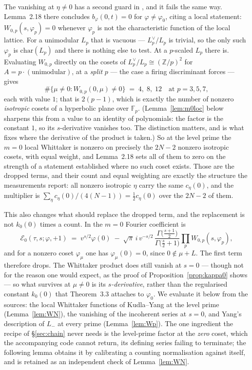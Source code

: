 \documentclass[11pt,reqno]{amsart}
\theoremstyle{plain}
\theoremstyle{definition}
\newcommand{\Z}{\mathbb{Z}}
\newcommand{\Lm}{L_{-}}
\begin{document}
The vanishing at $\eta\neq0$ has a second guard in \cite{SchoferThesis}, and it fails the same way.
Lemma~2.18 there concludes $b_\varphi(0,t)=0$ for $\varphi\neq\varphi_0$, citing a local statement:
$W_{0,p}(s,\varphi_p)=0$ whenever $\varphi_p$ is not the characteristic function of the local
lattice. For a unimodular $L_p$ that is vacuous --- $L_p^\vee/L_p$ is trivial, so the only such
$\varphi_p$ is $\mathrm{char}(L_p)$ and there is nothing else to test. At a $p$-scaled $L_p$ there
is. Evaluating $W_{0,p}$ directly on the cosets of $L_p^\vee/L_p\cong(\Z/p)^2$ for
$A=p\cdot(\text{unimodular})$, at a \emph{split} $p$ --- the case a firing discriminant forces ---
gives
\[
  \#\{\mu\neq0: W_{0,p}(0,\mu)\neq0\}\;=\;4,\;8,\;12 \quad\text{at } p=3,5,7,
\]
each with value $1$; that is $2(p-1)$, which is exactly the number of nonzero \emph{isotropic}
cosets of a hyperbolic plane over $\mathbb{F}_p$. (Lemma~\ref{lem:m0loc} below sharpens this from a
value to an identity of polynomials: the factor is the constant $1$, so its $s$-derivative vanishes
too. The distinction matters, and is what fixes where the derivative of the product is taken.)
So at the level prime the $m=0$ local Whittaker is
nonzero on precisely the $2N-2$ nonzero isotropic cosets, with equal weight, and Lemma~2.18 sets
all of them to zero on the strength of a statement established where no such coset exists. Those
are the dropped terms, and their count and equal weighting are exactly the structure the
measurements report: all nonzero isotropic $\eta$ carry the same $c_\eta(0)$, and the multiplier is
$\sum_\eta c_\eta(0)/(4(N-1))=\tfrac12c_\eta(0)$ over the $2N-2$ of them.

This also changes what should replace the dropped term, and the replacement is not
$k_0(0)$ times a count. In \cite[Lem.~2.18]{SchoferThesis} the $m=0$ Fourier coefficient is
\[
  \mathcal{E}_0(\tau,s;\varphi,+1)\;=\;v^{s/2}\varphi(0)
  \;-\;\sqrt{\pi}\,i\,v^{-s/2}\,
  \frac{\Gamma\bigl(\tfrac{s+1}{2}\bigr)}{\Gamma\bigl(\tfrac{s}{2}+1\bigr)}
  \prod_p W_{0,p}(s,\varphi_p),
\]
and for a nonzero coset $\varphi_\mu$ one has $\varphi_\mu(0)=0$, since $0\notin\mu+L$. The first
term therefore drops. The Whittaker product does still vanish at $s=0$ --- though not for the
reason one would expect, as the proof of Proposition~\ref{prop:kappa0} shows --- so what survives
at $\mu\neq0$ is its \emph{$s$-derivative}, rather than the regularised constant $k_0(0)$ that
Theorem~3.3 attaches to $\varphi_0$. We evaluate it below from the sources: the local Whittaker
functions of Kudla--Yang at the level prime (Lemma~\ref{lem:WN}), the vanishing of the incoherent
series at $s=0$, and Yang's description of $\Lm$ at every prime (Lemma~\ref{lem:Wp}). The one
ingredient the recipe of \S\ref{sec:chain} never needs is the level-prime factor at the
\emph{zero} coset, which the accompanying code cannot return, its defining series failing to
terminate; the following lemma obtains it by calibrating a counting normalisation against
\cite[Lem.~2.18]{SchoferThesis} itself, and is retained as an independent check of
Lemma~\ref{lem:WN}.
\end{document}
